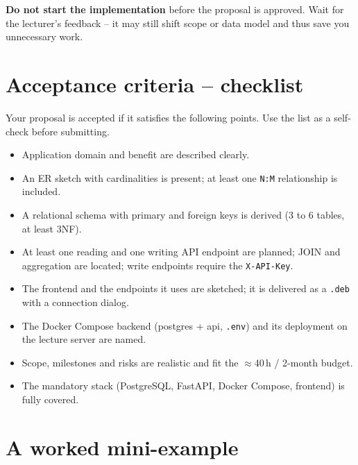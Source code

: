 \documentclass[11pt,a4paper]{article}
\begin{document}
\begin{warnbox}
\textbf{Do not start the implementation} before the proposal is approved. Wait
for the lecturer's feedback -- it may still shift scope or data model and thus
save you unnecessary work.
\end{warnbox}

\section{Acceptance criteria -- checklist}

Your proposal is accepted if it satisfies the following points. Use the list as
a self-check before submitting.

\begin{itemize}[leftmargin=1.8em, label=$\square$]
  \item Application domain and benefit are described clearly.
  \item An ER sketch with cardinalities is present; at least one \texttt{N:M}
        relationship is included.
  \item A relational schema with primary and foreign keys is derived
        (3 to 6 tables, at least 3NF).
  \item At least one reading and one writing API endpoint are planned; JOIN and
        aggregation are located; write endpoints require the \texttt{X-API-Key}.
  \item The frontend and the endpoints it uses are sketched; it is delivered as
        a \texttt{.deb} with a connection dialog.
  \item The Docker Compose backend (postgres + api, \texttt{.env}) and its
        deployment on the lecture server are named.
  \item Scope, milestones and risks are realistic and fit the
        $\approx$40\,h / 2-month budget.
  \item The mandatory stack (PostgreSQL, FastAPI, Docker Compose, frontend) is
        fully covered.
\end{itemize}

\section{A worked mini-example}
\end{document}
